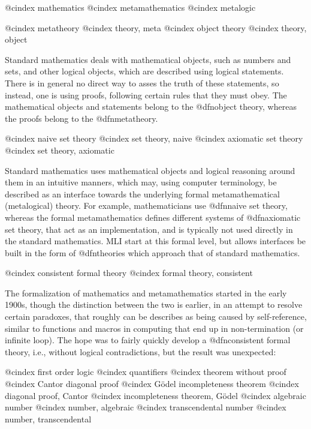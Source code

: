 @cindex mathematics
@cindex metamathematics
@cindex metalogic

@cindex metatheory
@cindex theory, meta
@cindex object theory
@cindex theory, object



Standard mathematics deals with mathematical objects, such as numbers and sets, and other logical objects, which are described using logical statements. There is in general no direct way to asses the truth of these statements, so instead, one is using proofs, following certain rules that they must obey. The mathematical objects and statements belong to the @dfn{object theory}, whereas the proofs belong to the @dfn{metatheory}.


@cindex naive set theory
@cindex set theory, naive
@cindex axiomatic set theory
@cindex set theory, axiomatic

Standard mathematics uses mathematical objects and logical reasoning around them in an intuitive manners, which may, using computer terminology, be described as an interface towards the underlying formal metamathematical (metalogical) theory. For example, mathematicians use @dfn{naive set theory}, whereas the formal metamathematics defines different systems of @dfn{axiomatic set theory}, that act as an implementation, and is typically not used directly in the standard mathematics. MLI start at this formal level, but allows interfaces be built in the form of @dfn{theories} which approach that of standard mathematics.


@cindex consistent formal theory
@cindex formal theory, consistent

The formalization of mathematics and metamathematics started in the early 1900s, though the distinction between the two is earlier, in an attempt to resolve certain paradoxes, that roughly can be describes as being caused by self-reference, similar to functions and macros in computing that end up in non-termination (or infinite loop). The hope was to fairly quickly develop a @dfn{consistent} formal theory, i.e., without logical contradictions, but the result was unexpected:


@cindex first order logic
@cindex quantifiers
@cindex theorem without proof
@cindex Cantor diagonal proof
@cindex Gödel incompleteness theorem
@cindex diagonal proof, Cantor
@cindex incompleteness theorem, Gödel
@cindex algebraic number
@cindex number, algebraic
@cindex transcendental number
@cindex number, transcendental


